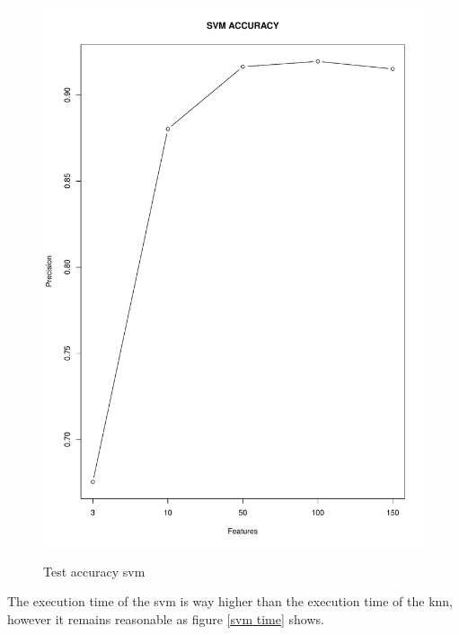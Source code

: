 \documentclass{article}
\begin{document}
\begin{figure}[H]
\begin{adjustwidth}{-4cm}{-4cm}
{    \includegraphics[scale=0.3]{../svm_accuracy_rgb.pdf}  
     }
     \centering
     \caption{Test accuracy svm} \label{svmaccuracy}
      \end{adjustwidth}
   \end{figure}

\noindent The execution time of the svm is way higher than the execution time of the knn, however it remains reasonable as figure \ref{svm time} shows.
   
\end{document}
